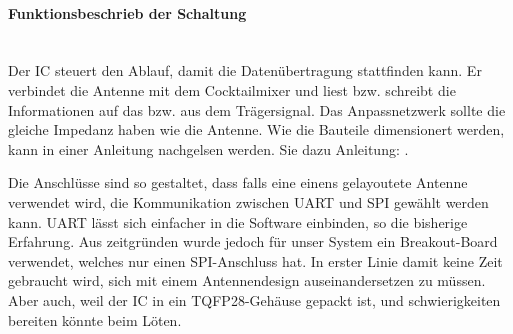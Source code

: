 \paragraph{Funktionsbeschrieb der Schaltung}\mbox{}\\

Der IC steuert den Ablauf, damit die Datenübertragung stattfinden kann. Er verbindet die Antenne mit dem Cocktailmixer und liest bzw. schreibt die Informationen auf das bzw. aus dem Trägersignal. Das Anpassnetzwerk sollte die gleiche Impedanz haben wie die Antenne. Wie die Bauteile dimensionert werden, kann in einer Anleitung nachgelsen werden. Sie dazu Anleitung: \cite{nxp_bv_2010_antenna_2010}.

Die Anschlüsse sind so gestaltet, dass falls eine einens gelayoutete Antenne verwendet wird, die Kommunikation zwischen UART und SPI gewählt werden kann. UART lässt sich einfacher in die Software einbinden, so die bisherige Erfahrung. Aus zeitgründen wurde jedoch für unser System ein Breakout-Board verwendet, welches nur einen SPI-Anschluss hat. In erster Linie damit keine Zeit gebraucht wird, sich mit einem Antennendesign auseinandersetzen zu müssen. Aber auch, weil der IC in ein TQFP28-Gehäuse gepackt ist, und schwierigkeiten bereiten könnte beim Löten.